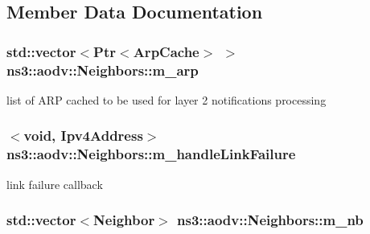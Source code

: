 \subsection{Member Data Documentation}
\subsubsection[{\texorpdfstring{m\+\_\+arp}{m_arp}}]{\setlength{\rightskip}{0pt plus 5cm}std\+::vector$<${\bf Ptr}$<${\bf Arp\+Cache}$>$ $>$ ns3\+::aodv\+::\+Neighbors\+::m\+\_\+arp\hspace{0.3cm}{\ttfamily [private]}}\hypertarget{classns3_1_1aodv_1_1Neighbors_a6e0800b74469fc43603d2824a8dbb8e7}{}\label{classns3_1_1aodv_1_1Neighbors_a6e0800b74469fc43603d2824a8dbb8e7}


list of A\+RP cached to be used for layer 2 notifications processing 

\subsubsection[{\texorpdfstring{m\+\_\+handle\+Link\+Failure}{m_handleLinkFailure}}]{$<$void, {\bf Ipv4\+Address}$>$ ns3\+::aodv\+::\+Neighbors\+::m\+\_\+handle\+Link\+Failure\hspace{0.3cm}{\ttfamily [private]}}\hypertarget{classns3_1_1aodv_1_1Neighbors_a9f8078f57932255c9fc05f6f3bcef8ab}{}\label{classns3_1_1aodv_1_1Neighbors_a9f8078f57932255c9fc05f6f3bcef8ab}


link failure callback 

\subsubsection[{\texorpdfstring{m\+\_\+nb}{m_nb}}]{\setlength{\rightskip}{0pt plus 5cm}std\+::vector$<${\bf Neighbor}$>$ ns3\+::aodv\+::\+Neighbors\+::m\+\_\+nb\hspace{0.3cm}{\ttfamily [private]}}\hypertarget{classns3_1_1aodv_1_1Neighbors_a885bb3a178f3583ed73e391d918f2f63}{}\label{classns3_1_1aodv_1_1Neighbors_a885bb3a178f3583ed73e391d918f2f63}


